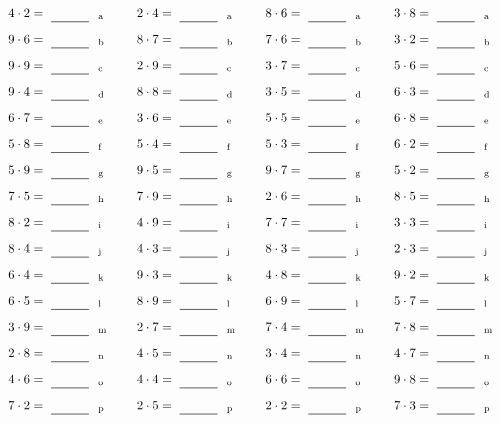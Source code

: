 \documentclass
[
  draft    = true,
  fontsize = 11pt,
  parskip  = half-
]
{scrartcl}
\begin{document}
\par\vfill\par
\begin{align*}
    \pline{4\cdot2}&=\rline{a}
  & \pline{2\cdot4}&=\rline{a}
  & \pline{8\cdot6}&=\rline{a}
  & \pline{3\cdot8}&=\rline{a} \\[1ex]
    \pline{9\cdot6}&=\rline{b}
  & \pline{8\cdot7}&=\rline{b}
  & \pline{7\cdot6}&=\rline{b}
  & \pline{3\cdot2}&=\rline{b} \\[1ex]
    \pline{9\cdot9}&=\rline{c}
  & \pline{2\cdot9}&=\rline{c}
  & \pline{3\cdot7}&=\rline{c}
  & \pline{5\cdot6}&=\rline{c} \\[1ex]
    \pline{9\cdot4}&=\rline{d}
  & \pline{8\cdot8}&=\rline{d}
  & \pline{3\cdot5}&=\rline{d}
  & \pline{6\cdot3}&=\rline{d} \\[1ex]
    \pline{6\cdot7}&=\rline{e}
  & \pline{3\cdot6}&=\rline{e}
  & \pline{5\cdot5}&=\rline{e}
  & \pline{6\cdot8}&=\rline{e} \\[1ex]
    \pline{5\cdot8}&=\rline{f}
  & \pline{5\cdot4}&=\rline{f}
  & \pline{5\cdot3}&=\rline{f}
  & \pline{6\cdot2}&=\rline{f} \\[1ex]
    \pline{5\cdot9}&=\rline{g}
  & \pline{9\cdot5}&=\rline{g}
  & \pline{9\cdot7}&=\rline{g}
  & \pline{5\cdot2}&=\rline{g} \\[1ex]
    \pline{7\cdot5}&=\rline{h}
  & \pline{7\cdot9}&=\rline{h}
  & \pline{2\cdot6}&=\rline{h}
  & \pline{8\cdot5}&=\rline{h} \\[1ex]
    \pline{8\cdot2}&=\rline{i}
  & \pline{4\cdot9}&=\rline{i}
  & \pline{7\cdot7}&=\rline{i}
  & \pline{3\cdot3}&=\rline{i} \\[1ex]
    \pline{8\cdot4}&=\rline{j}
  & \pline{4\cdot3}&=\rline{j}
  & \pline{8\cdot3}&=\rline{j}
  & \pline{2\cdot3}&=\rline{j} \\[1ex]
    \pline{6\cdot4}&=\rline{k}
  & \pline{9\cdot3}&=\rline{k}
  & \pline{4\cdot8}&=\rline{k}
  & \pline{9\cdot2}&=\rline{k} \\[1ex]
    \pline{6\cdot5}&=\rline{l}
  & \pline{8\cdot9}&=\rline{l}
  & \pline{6\cdot9}&=\rline{l}
  & \pline{5\cdot7}&=\rline{l} \\[1ex]
    \pline{3\cdot9}&=\rline{m}
  & \pline{2\cdot7}&=\rline{m}
  & \pline{7\cdot4}&=\rline{m}
  & \pline{7\cdot8}&=\rline{m} \\[1ex]
    \pline{2\cdot8}&=\rline{n}
  & \pline{4\cdot5}&=\rline{n}
  & \pline{3\cdot4}&=\rline{n}
  & \pline{4\cdot7}&=\rline{n} \\[1ex]
    \pline{4\cdot6}&=\rline{o}
  & \pline{4\cdot4}&=\rline{o}
  & \pline{6\cdot6}&=\rline{o}
  & \pline{9\cdot8}&=\rline{o} \\[1ex]
    \pline{7\cdot2}&=\rline{p}
  & \pline{2\cdot5}&=\rline{p}
  & \pline{2\cdot2}&=\rline{p}
  & \pline{7\cdot3}&=\rline{p}
\end{align*}
\end{document}
